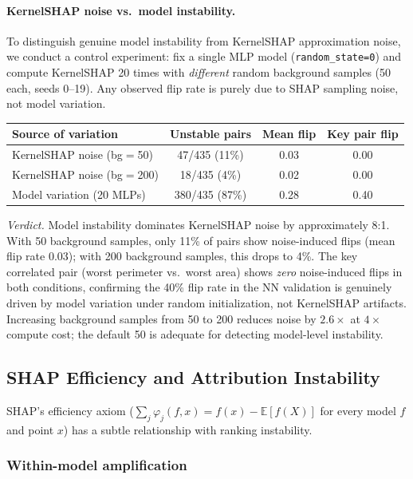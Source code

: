 \documentclass{article}
\newcommand{\E}{\mathbb{E}}
\begin{document}
\paragraph{KernelSHAP noise vs.\ model instability.}
To distinguish genuine model instability from KernelSHAP approximation
noise, we conduct a control experiment: fix a single MLP model
(\texttt{random\_state=0}) and compute KernelSHAP 20 times with
\emph{different} random background samples (50 each, seeds 0--19).
Any observed flip rate is purely due to SHAP sampling noise, not
model variation.

\begin{center}
\small
\begin{tabular}{@{}lccc@{}}
\toprule
Source of variation & Unstable pairs & Mean flip & Key pair flip \\
\midrule
KernelSHAP noise (bg$=$50) & 47/435 (11\%) & 0.03 & 0.00 \\
KernelSHAP noise (bg$=$200) & 18/435 (4\%) & 0.02 & 0.00 \\
Model variation (20 MLPs) & 380/435 (87\%) & 0.28 & 0.40 \\
\bottomrule
\end{tabular}
\end{center}

\emph{Verdict.}
Model instability dominates KernelSHAP noise by approximately 8:1.
With 50 background samples, only 11\% of pairs show noise-induced
flips (mean flip rate 0.03); with 200 background samples, this drops
to 4\%. The key correlated pair (worst perimeter vs.\ worst area)
shows \emph{zero} noise-induced flips in both conditions, confirming
the 40\% flip rate in the NN validation is genuinely driven by model
variation under random initialization, not KernelSHAP artifacts.
Increasing background samples from 50 to 200 reduces noise by
$2.6\times$ at $4\times$ compute cost; the default 50 is adequate
for detecting model-level instability.

\subsection{SHAP Efficiency and Attribution Instability}

SHAP's efficiency axiom ($\sum_j \varphi_j(f,x) = f(x) - \E[f(X)]$ for every model $f$ and point $x$) has a subtle relationship with ranking instability.

\subsubsection{Within-model amplification}
\end{document}

